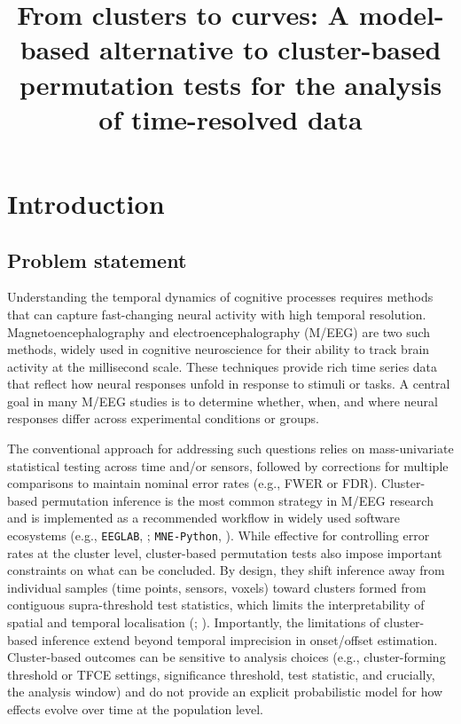 \documentclass[
  doc,
  floatsintext,
  longtable,
  a4paper,
  nolmodern,
  notxfonts,
  notimes,
  colorlinks=true,linkcolor=blue,citecolor=blue,urlcolor=blue]{apa7}
\title{From clusters to curves: A model-based alternative to
cluster-based permutation tests for the analysis of time-resolved data}
\begin{document}
\maketitle



\setcounter{secnumdepth}{3}

\setlength\LTleft{0pt}




\setlength{\parindent}{0pt}
\setlength{\parskip}{6pt}

\newpage

\section{Introduction}\label{introduction}

\setcounter{page}{2}

\subsection{Problem statement}\label{problem-statement}

Understanding the temporal dynamics of cognitive processes requires
methods that can capture fast-changing neural activity with high
temporal resolution. Magnetoencephalography and electroencephalography
(M/EEG) are two such methods, widely used in cognitive neuroscience for
their ability to track brain activity at the millisecond scale. These
techniques provide rich time series data that reflect how neural
responses unfold in response to stimuli or tasks. A central goal in many
M/EEG studies is to determine whether, when, and where neural responses
differ across experimental conditions or groups.

The conventional approach for addressing such questions relies on
mass-univariate statistical testing across time and/or sensors, followed
by corrections for multiple comparisons to maintain nominal error rates
(e.g., FWER or FDR). Cluster-based permutation inference is the most
common strategy in M/EEG research and is implemented as a recommended
workflow in widely used software ecosystems (e.g., \texttt{EEGLAB},
;
\texttt{MNE-Python}, ). While
effective for controlling error rates at the cluster level,
cluster-based permutation tests also impose important constraints on
what can be concluded. By design, they shift inference away from
individual samples (time points, sensors, voxels) toward clusters formed
from contiguous supra-threshold test statistics, which limits the
interpretability of spatial and temporal localisation
(;
).
Importantly, the limitations of cluster-based inference extend beyond
temporal imprecision in onset/offset estimation. Cluster-based outcomes
can be sensitive to analysis choices (e.g., cluster-forming threshold or
TFCE settings, significance threshold, test statistic, and crucially,
the analysis window) and do not provide an explicit probabilistic model
for how effects evolve over time at the population level.
\end{document}
